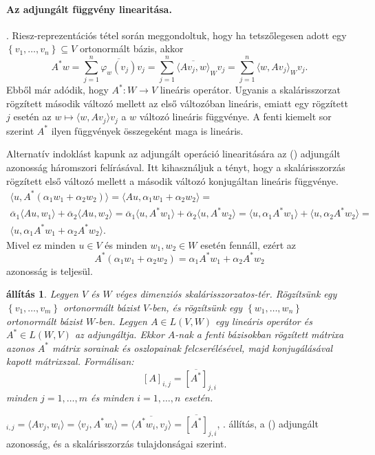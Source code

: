 \documentclass[a4paper, showtrims]{memoir}
\makeatletter
\renewenvironment{proof}[1][\proofname]
    {\par\pushQED{\qed}%
    \normalfont \topsep6\p@\@plus6\p@\relax
    \trivlist
    \item[\hskip\labelsep
        \itshape
    #1\@addpunct{:}]\ignorespaces}
    {\popQED\endtrivlist\@endpefalse}
\theoremstyle{plain}
\newtheorem{proposition}{állítás}[chapter]
\theoremstyle{remark}
\theoremstyle{definition}
\newcommand{\ip}[2]{\langle#1,#2\rangle}
\makeatother
\begin{document}
\paragraph{Az adjungált függvény linearitása.}
. Riesz-reprezentációs tétel során meggondoltuk,
hogy ha tetszőlegesen adott egy
$\left\{ v_1,\ldots,v_n \right\}\subseteq V$
ortonormált bázis, akkor
\[
	A^\ast w
	=
	\sum_{j=1}^n\overline{\varphi_w\left( v_j \right)}v_j
	=
	\sum_{j=1}^n\overline{\ip{Av_j}{w}}_Wv_j
	=
	\sum_{j=1}^n\ip{w}{Av_j}_Wv_j.
\]
Ebből már adódik, hogy $A^\ast:W\to V$ lineáris operátor.
Ugyanis a skalárisszorzat rögzített második változó mellett az első változóban lineáris,
emiatt egy rögzített $j$ esetén az $w\mapsto \ip{w}{Av_j}v_j$ a $w$ változó lineáris függvénye. A fenti kiemelt sor szerint $A^\ast$ ilyen függvények összegeként maga is lineáris.

Alternatív indoklást kapunk az adjungált operáció linearitására az (\dag) adjungált azonosság háromszori felírásával.
Itt kihasználjuk a tényt, hogy a skalárisszorzás rögzített első változó mellett a második változó konjugáltan lineáris függvénye.
\begin{multline*}
	\ip{u}{A^\ast\left( \alpha_1w_1+\alpha_2w_2 \right)}
	=
	\ip{Au}{\alpha_1w_1+\alpha_2w_2}
	=\\
	\overline{\alpha}_1\ip{Au}{w_1}+\overline{\alpha}_2\ip{Au}{w_2}
	=
	\overline{\alpha}_1\ip{u}{A^\ast w_1}+\overline{\alpha}_2\ip{u}{A^\ast w_2}
	=
	\ip{u}{\alpha_1 A^\ast w_1}+\ip{u}{\alpha_2 A^\ast w_2}
	=\\
	\ip{u}{\alpha_1 A^\ast w_1+\alpha_2 A^\ast w_2}.
\end{multline*}
Mivel ez minden $u\in V$ és minden $w_1,w_2\in W$ esetén fennáll,
ezért az
\begin{displaymath}
	A^\ast\left( \alpha_1w_1+\alpha_2w_2 \right)
	=
	\alpha_1A^\ast w_1+ \alpha_2A^\ast w_2
\end{displaymath}
azonosság is teljesül.

\begin{proposition}
	Legyen $V$ és $W$ véges dimenziós skalárisszorzatos-tér.
	Rögzítsünk egy $\left\{ v_1,\ldots,v_m \right\}$ ortonormált bázist $V$-ben,
	és rögzítsünk egy $\left\{w_1,\ldots,w_n\right\}$ ortonormált bázist $W$-ben.
	Legyen $A\in L\left( V,W \right)$ egy lineáris operátor és $A^\ast\in L\left( W,V \right)$ az adjungáltja.
	Ekkor $A$-nak a fenti bázisokban rögzített mátrixa azonos
	$A^\ast$ mátrix sorainak és oszlopainak felcserélésével, majd konjugálásával kapott mátrixszal.
	Formálisan:
	\[
		\left[ A \right]_{i,j}=\overline{\left[ A^\ast \right]}_{j,i}
	\]
	minden $j=1,\ldots,m$ és minden $i=1,\ldots,n$ esetén.
\end{proposition}
\begin{proof}
	\begin{math}
		[A]_{i,j}
		=
		\ip{Av_j}{w_i}
		=
		\ip{v_j}{A^\ast w_i}
		=
		\overline{
			\ip{A^\ast w_i}{v_j}
		}
		=
		\overline{
			[A^\ast]
		}_{j,i}
	\end{math},
    . állítás, a (\dag) adjungált azonosság, és a skalárisszorzás tulajdonságai szerint.
\end{proof}
\end{document}
